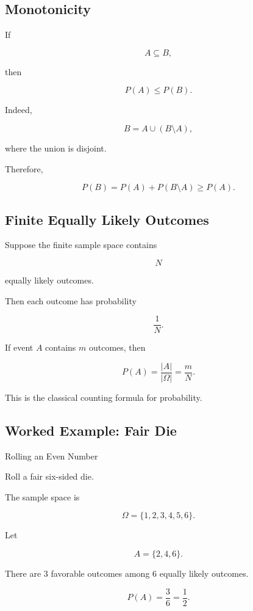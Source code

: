 \subsection{Monotonicity}
\label{subsec:probability-monotonicity}

If

\[
A\subseteq B,
\]

then

\[
\boxed{
P(A)\leq P(B).
}
\]

Indeed,

\[
B
=
A\cup(B\setminus A),
\]

where the union is disjoint.

Therefore,

\[
P(B)
=
P(A)+P(B\setminus A)
\geq
P(A).
\]

\subsection{Finite Equally Likely Outcomes}
\label{subsec:equally-likely-outcomes}

Suppose the finite sample space contains

\[
N
\]

equally likely outcomes.

Then each outcome has probability

\[
\frac1N.
\]

If event \(A\) contains \(m\) outcomes, then

\[
\boxed{
P(A)
=
\frac{|A|}{|\Omega|}
=
\frac{m}{N}.
}
\]

This is the classical counting formula for probability.

\subsection{Worked Example: Fair Die}
\label{subsec:worked-fair-die}

\begin{workedexamplebox}{Rolling an Even Number}

Roll a fair six-sided die.

The sample space is

\[
\Omega
=
\{1,2,3,4,5,6\}.
\]

Let

\[
A=\{2,4,6\}.
\]

There are \(3\) favorable outcomes among \(6\) equally likely outcomes.

\begin{answerbox}
\[
\boxed{
P(A)
=
\frac36
=
\frac12.
}
\]
\end{answerbox}

\end{workedexamplebox}


